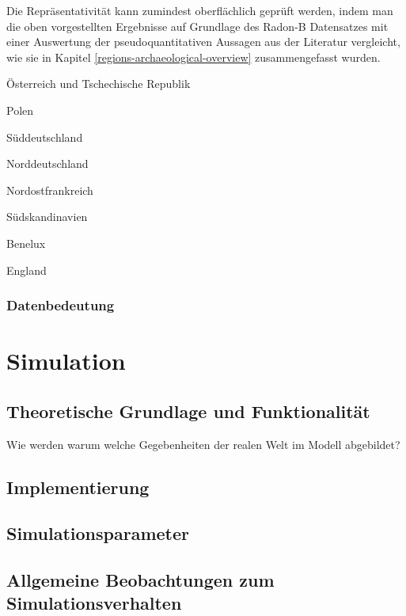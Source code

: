 \documentclass[openany,twoside,twocolumn]{book}
\begin{document}
Die Repräsentativität kann zumindest oberflächlich geprüft werden, indem
man die oben vorgestellten Ergebnisse auf Grundlage des Radon-B
Datensatzes mit einer Auswertung der pseudoquantitativen Aussagen aus
der Literatur vergleicht, wie sie in Kapitel
\ref{regions-archaeological-overview} zusammengefasst wurden.

Österreich und Tschechische Republik

Polen

Süddeutschland

Norddeutschland

Nordostfrankreich

Südskandinavien

Benelux

England

\hypertarget{datenbedeutung}{%
\subsubsection{Datenbedeutung}\label{datenbedeutung}}

\hypertarget{simulation}{%
\section{Simulation}\label{simulation}}

\hypertarget{theoretische-grundlage-und-funktionalitat}{%
\subsection{Theoretische Grundlage und
Funktionalität}\label{theoretische-grundlage-und-funktionalitat}}

Wie werden warum welche Gegebenheiten der realen Welt im Modell
abgebildet?

\hypertarget{implementierung}{%
\subsection{Implementierung}\label{implementierung}}

\hypertarget{simulationsparameter}{%
\subsection{Simulationsparameter}\label{simulationsparameter}}

\hypertarget{allgemeine-beobachtungen-zum-simulationsverhalten}{%
\subsection{Allgemeine Beobachtungen zum
Simulationsverhalten}\label{allgemeine-beobachtungen-zum-simulationsverhalten}}
\end{document}
